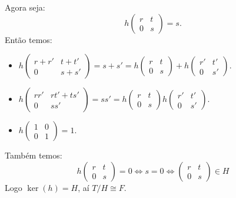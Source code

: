 \documentclass[10pt,a4paper]{article}
\begin{document}
\noindent
Agora seja:
\[
h\begin{pmatrix}
r&t\\0&s
\end{pmatrix}=s.
\]
Então temos:
\begin{itemize}
\item $h\begin{pmatrix}
r+r'&t+t'\\0&s+s'
\end{pmatrix}=s+s'=h\begin{pmatrix}
r&t\\0&s
\end{pmatrix}+h\begin{pmatrix}
r'&t'\\0&s'
\end{pmatrix}.$
\item $h\begin{pmatrix}
rr'&rt'+ts'\\0&ss'
\end{pmatrix}=ss'=h\begin{pmatrix}
r&t\\0&s
\end{pmatrix}h\begin{pmatrix}
r'&t'\\0&s'
\end{pmatrix}.$
\item $h\begin{pmatrix}
1&0\\0&1
\end{pmatrix}=1.$
\end{itemize}
Também temos:
\[
h\begin{pmatrix}
r&t\\0&s
\end{pmatrix}=0\Leftrightarrow s=0\Leftrightarrow\begin{pmatrix}
r&t\\0&s
\end{pmatrix}\in H
\]
Logo $\ker(h)=H$, aí $T/H\cong F$.
\end{document}
